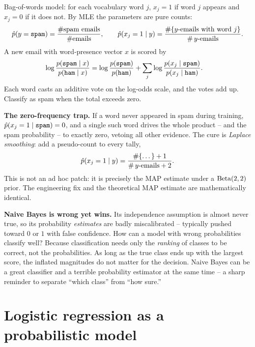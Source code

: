 \begin{example}
\label{ch34:spam}
Bag-of-words model: for each vocabulary word $j$, $x_j = 1$ if word $j$ appears and $x_j = 0$ if it does not. By MLE the parameters are pure
counts:
\[
  \hat p(y=\texttt{spam}) = \frac{\#\text{spam emails}}{\#\text{emails}},
  \qquad
  \hat p(x_j=1\mid y) = \frac{\#\{y\text{-emails with word } j\}}{\#\,y\text{-emails}}.
\]
A new email with word-presence vector $x$ is scored by
\begin{align*}
  \log\frac{p(\texttt{spam}\mid x)}{p(\texttt{ham}\mid x)}
  &= \log\frac{p(\texttt{spam})}{p(\texttt{ham})}
   + \sum_{j} \log\frac{p(x_j\mid\texttt{spam})}{p(x_j\mid\texttt{ham})}.
\end{align*}
Each word casts an additive vote on the log-odds scale, and the votes add
up. Classify as spam when the total exceeds zero.
\end{example}

\begin{trapbox}
\textbf{The zero-frequency trap.} If a word never appeared in spam during
training, $\hat p(x_j=1\mid\texttt{spam}) = 0$, and a single such word drives
the whole product -- and the spam probability -- to exactly zero, vetoing all
other evidence. The cure is \emph{Laplace smoothing}: add a pseudo-count to every
tally,
\[
  \hat p(x_j=1\mid y) = \frac{\#\{\dots\} + 1}{\#\,y\text{-emails} + 2}.
\]
This is not an ad hoc patch: it is precisely the MAP estimate under a
$\operatorname{Beta}(2,2)$ prior. The engineering fix and the theoretical MAP estimate are mathematically identical.
\end{trapbox}

\begin{paradoxbox}
\textbf{Naive Bayes is wrong yet wins.} Its independence assumption is almost
never true, so its probability \emph{estimates} are badly miscalibrated --
typically pushed toward $0$ or $1$ with false confidence. How can a model with
wrong probabilities classify well? Because classification needs only the
\emph{ranking} of classes to be correct, not the probabilities. As long as the
true class ends up with the largest score, the inflated magnitudes do not matter
for the decision. Naive Bayes can be a great classifier and a terrible
probability estimator at the same time -- a sharp reminder to separate ``which
class'' from ``how sure.''
\end{paradoxbox}

\section{Logistic regression as a probabilistic model}
\label{ch34:logistic}

